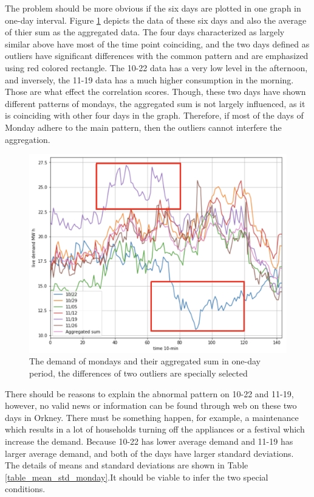 \documentclass[12pt,a4paper]{report}
\begin{document}
                The problem should be more obvious if the six days are plotted in one graph in one-day interval. Figure \ref{plot_monday_demand} depicts the data of these six days and also the average of thier sum as the aggregated data. The four days characterized as largely similar above have most of the time point coinciding, and the two days defined as outliers have significant differences with the common pattern and are emphasized using red colored rectangle. The 10-22 data has a very low level in the afternoon, and inversely, the 11-19 data has a much higher consumption in the morning. Those are what effect the correlation scores. Though, these two days have shown different patterns of mondays, the aggregated sum is not largely influenced, as it is coinciding with other four days in the graph. Therefore, if most of the days of Monday adhere to the main pattern, then the outliers cannot interfere the aggregation.

                \begin{figure}[ht]
                    \label{plot_monday_demand}
                    \centerline{\includegraphics[scale=0.27]{monday_demand}}
                    \caption{The demand of mondays and their aggregated sum in one-day period, the differences of two outliers are specially selected}
                \end{figure}

                There should be reasons to explain the abnormal pattern on 10-22 and 11-19, however, no valid news or information can be found through web on these two days in Orkney. There must be something happen, for example, a maintenance which results in a lot of households turning off the appliances or a festival which increase the demand. Because 10-22 has lower average demand and 11-19 has larger average demand, and both of the days have larger standard deviations. The details of means and standard deviations are shown in Table \ref{table_mean_std_monday}.It should be viable to infer the two special conditions.
\end{document}
